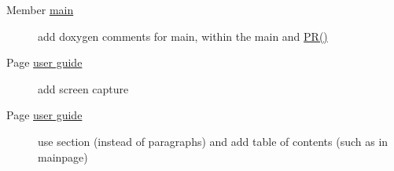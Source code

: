 \label{todo__todo000003}
\hypertarget{todo__todo000003}{}
 \begin{description}
\item[Member \hyperlink{CImg_8display_8cpp_3c04138a5bfe5d72780bb7e82a18e627}{main} ]add doxygen comments for main, within the main and \hyperlink{CImg_8display_8cpp_ea1ac050c1347d4a67f85cbfc88ec8cf}{PR()} \end{description}


\label{todo__todo000001}
\hypertarget{todo__todo000001}{}
 \begin{description}
\item[Page \hyperlink{user}{user guide} ]add screen capture \end{description}


\label{todo__todo000001}
\hypertarget{todo__todo000001}{}
 \begin{description}
\item[Page \hyperlink{user}{user guide} ]use section (instead of paragraphs) and add table of contents (such as in mainpage)

\end{description}
